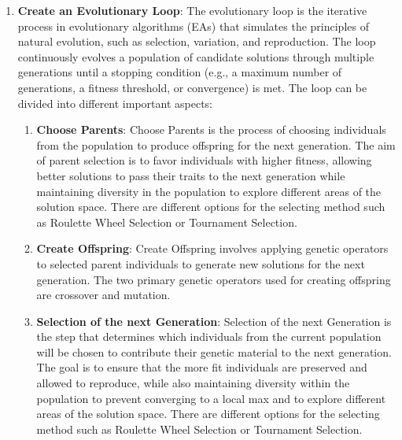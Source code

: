 \begin{onehalfspace}
\begin{enumerate}
  \item \textbf{Create an Evolutionary Loop}: The evolutionary loop is the iterative process in evolutionary algorithms 
  (EAs) that simulates the principles of natural evolution, such as selection, variation, and 
  reproduction. The loop continuously evolves a population of candidate solutions through multiple 
  generations until a stopping condition (e.g., a maximum number of generations, a fitness threshold, 
  or convergence) is met. The loop can be divided into different important aspects:
  \begin{enumerate}
    \item \textbf{Choose Parents}: Choose Parents is the process of choosing individuals from the population 
    to produce  offspring for the next generation. The aim of parent selection is to favor individuals 
    with higher fitness, allowing better solutions to pass their traits to the next generation while 
    maintaining diversity in the population to explore different areas of the solution space. There are
    different options for the selecting method such as Roulette Wheel Selection or Tournament Selection.
    \item \textbf{Create Offspring}:  Create Offspring involves applying genetic 
    operators to selected parent individuals to generate new solutions for the next generation. 
    The two primary genetic operators used for creating offspring are crossover and mutation.
    \item \textbf{Selection of the next Generation}: Selection of the next Generation is the step that 
    determines which individuals from the current population will be chosen to contribute 
    their genetic material to the next generation. The goal is to ensure that the more fit 
    individuals are preserved and allowed to reproduce, while also maintaining diversity 
    within the population to prevent converging to a local max and to explore different areas of the 
    solution space. There are different options for the selecting method such 
    as Roulette Wheel Selection or Tournament Selection.
  \end{enumerate}
\end{enumerate}






\end{onehalfspace}
